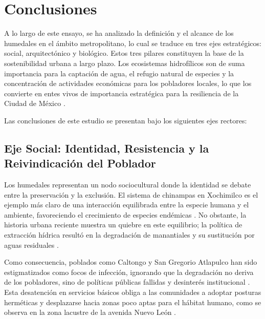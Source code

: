 
\section{Conclusiones}

A lo largo de este ensayo, se ha analizado la definición y el alcance de los humedales en el ámbito metropolitano, 
lo cual se traduce en tres ejes estratégicos: social, arquitectónico y biológico. Estos tres pilares constituyen 
la base de la sostenibilidad urbana a largo plazo. Los ecosistemas hidrofílicos son de suma importancia para la 
captación de agua, el refugio natural de especies y la concentración de actividades económicas para los pobladores locales, 
lo que los convierte en entes vivos de importancia estratégica para la resiliencia de la Ciudad de México \cite{paot2006xochimilco, sedema2022programa}. 

Las conclusiones de este estudio se presentan bajo los siguientes ejes rectores:

\subsection{Eje Social: Identidad, Resistencia y la Reivindicación del Poblador}

Los humedales representan un nodo sociocultural donde la identidad se debate entre la preservación y la exclusión. 
El sistema de chinampas en Xochimilco es el ejemplo más claro de una interacción equilibrada entre la especie humana y el ambiente, 
favoreciendo el crecimiento de especies endémicas \cite{paot2006xochimilco}. No obstante, la historia urbana reciente muestra un 
quiebre en este equilibrio; la política de extracción hídrica resultó en la degradación de manantiales y su sustitución por aguas 
residuales \cite{paot2006xochimilco}. 

Como consecuencia, poblados como Caltongo y San Gregorio Atlapulco han sido estigmatizados como focos de infección, ignorando 
que la degradación no deriva de los pobladores, sino de políticas públicas fallidas y desinterés institucional \cite{rojas2020deterioro}. 
Esta desatención en servicios básicos obliga a las comunidades a adoptar posturas herméticas y desplazarse hacia zonas poco aptas para el 
hábitat humano, como se observa en la zona lacustre de la avenida Nuevo León \cite{rojas2020deterioro}.

